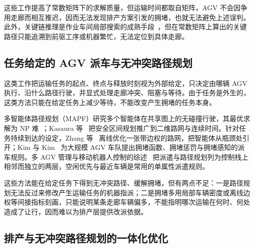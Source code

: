 \documentclass[manuscript,screen,review]{acmart}
\begin{document}
这些工作提高了常数矩阵下的求解质量，但运输时间都取自矩阵，AGV 不会因争用走廊而相互推迟，因而无法发现排产方案引发的拥堵，也就无法避免上述误判。此外，关键链推理是作业车间局部搜索的成熟手段~\cite{otala2021graph,tamssaouet2023neighborhood}，但在常数矩阵上算出的关键路径只能追溯到前驱工序或机器繁忙，无法定位到具体走廊。

\subsection{任务给定的 AGV 派车与无冲突路径规划}
\label{sec:rw_route}

这类工作把运输任务的起点、终点与释放时刻视为外部给定，只决定由哪辆 AGV 执行、沿什么路径行驶，并显式处理走廊冲突、阻塞与等待。由于任务是外生的，这类方法只能在给定任务上减少等待，不能改变产生拥堵的任务本身。

多智能体路径规划（MAPF）研究多个智能体在共享图上的无碰撞行驶，其最优求解为 NP 难~\cite{gao2023mapf}；Kasaura 等~\cite{kasaura2022sipp} 把安全区间规划推广到二维路网与连续时间。针对任务持续到达的设定，Zhang 等~\cite{zhang2024guidance} 离线优化一张带边权的路网，把智能体从瓶颈处引开；Kim 与 Kim~\cite{kim2026congestion} 为大规模 AGV 车队提出拥堵函数、拥堵惩罚与拥堵感知的派车规则。多 AGV 管理与移动机器人控制的综述~\cite{lu2022agv,fragapane2021planning} 把派遣与路径规划列为控制栈上相邻而独立的两层，空闲优先与最近车辆是常用的单属性派遣规则。

这些方法能在给定任务下得到无冲突路径、缓解拥堵，但有两点不足：一是路径规划无法反过来修改产生运输任务的机器指派；二是拥堵多用局部车辆密度或离线边权等间接指标刻画，只能说明某条走廊车辆偏多，不能指明哪次运输在何时、何处造成了让行，因而难以为排产层提供改派依据。

\subsection{排产与无冲突路径规划的一体化优化}
\label{sec:rw_integ}
\end{document}
